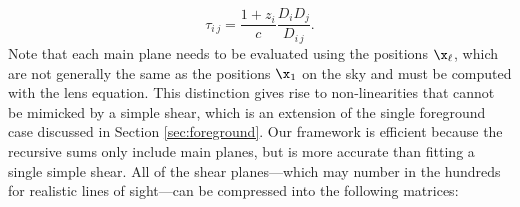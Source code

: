 \begin{equation}
\tau_{i\,j} = \frac{ 1 + z_i}{c} \frac{D_i D_j}{D_{i\,j}}.
\end{equation}
Note that each main plane needs to be evaluated using the positions $\x_\ell$, which are not generally the same as the positions $\x_1$ on the sky and must be computed with the lens equation. This distinction gives rise to non-linearities that cannot be mimicked by a simple shear, which is an extension of the single foreground case discussed in Section \ref{sec:foreground}. Our framework is efficient because the recursive sums only include main planes, but is more accurate than fitting a single simple shear. All of the shear planes---which may number in the hundreds for realistic lines of sight---can be compressed into the following matrices:
  
  